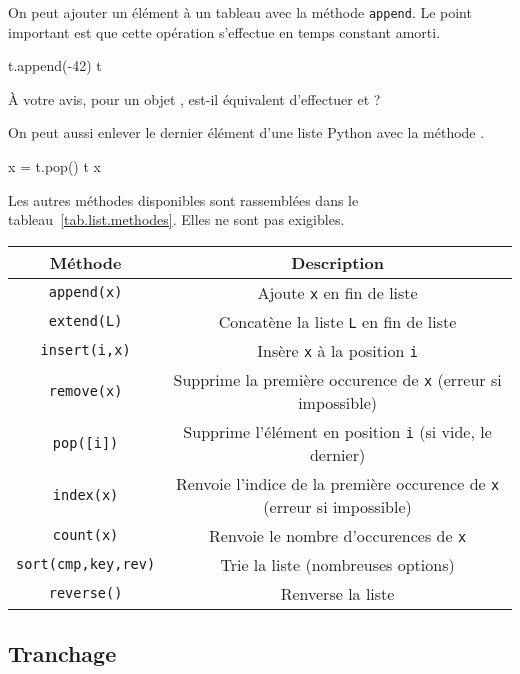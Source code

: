 On peut ajouter un élément à un tableau avec la méthode \texttt{append}. Le point important est que 
cette opération s'effectue en temps constant amorti.
\begin{pyconsole}
t.append(-42)
t
\end{pyconsole}
\`A votre avis, pour un objet , est-il équivalent d'effectuer  et  ?

On peut aussi enlever le dernier élément d'une liste Python avec la méthode .
\begin{pyconsole}
x = t.pop()
t
x
\end{pyconsole}

Les autres méthodes disponibles sont rassemblées dans le tableau~\ref{tab.list.methodes}. Elles ne sont pas exigibles.
  \begin{center}
    \begin{tabular}{|c|c|}
      \hline 
      Méthode & Description \\
      \hline
      \texttt{append(x)} & Ajoute \texttt{x} en fin de liste \\
      \hline
      \texttt{extend(L)} & Concatène la liste \texttt{L} en fin de liste \\
      \hline
      \texttt{insert(i,x)} & Insère  \texttt{x} à la position \texttt{i} \\
      \hline
      \texttt{remove(x)} & Supprime la première occurence de \texttt{x} (erreur si impossible)\\
      \hline
      \texttt{pop([i])} & Supprime l'élément en position \texttt{i} (si vide, le dernier) \\
      \hline 
      \texttt{index(x)} & Renvoie l'indice de la première occurence de \texttt{x} (erreur si impossible)\\
      \hline
      \texttt{count(x)} & Renvoie le nombre d'occurences de \texttt{x} \\
      \hline
      \texttt{sort(cmp,key,rev)} & Trie la liste (nombreuses options) \\
      \hline
      \texttt{reverse()} & Renverse la liste \\
      \hline
    \end{tabular}
  \label{tab.list.methodes}
  \end{center}

%
\subsection{Tranchage}

